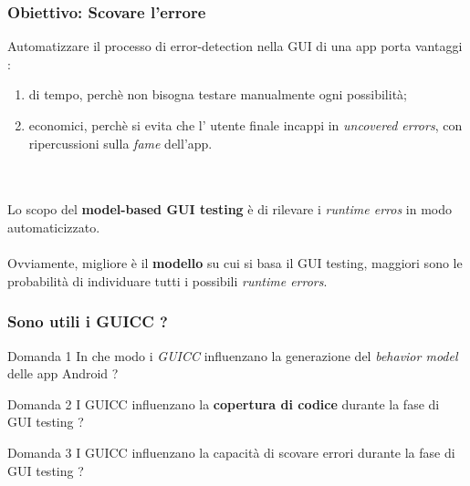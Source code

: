 \documentclass[12pt]{beamer}
\begin{document}
\begin{frame}
\frametitle{Obiettivo: Scovare l'errore}
 
    Automatizzare il processo di error-detection nella GUI di una app porta vantaggi :
    \begin{enumerate}
        \item di tempo, perch\`e non bisogna testare manualmente ogni possibilit\`a;
        \item economici, perch\`e si evita che l' utente finale incappi in \textit{uncovered errors}, con ripercussioni sulla \textit{fame} dell'app.
    \end{enumerate}
    \\~\\
    Lo scopo del \textbf{model-based GUI testing} \`e di rilevare i \textit{runtime erros} in modo automaticizzato.
    \\~\\
    Ovviamente, migliore \`e il \textbf{modello} su cui si basa il GUI testing, maggiori sono le probabilit\`a di individuare tutti i possibili \textit{runtime errors}. 




\end{frame}


\begin{frame}
\frametitle{Sono utili i GUICC ?}

\begin{block}{Domanda 1}
In che modo i \emph{GUICC} influenzano la generazione del \textit{behavior model} delle app Android ?
\end{block}

\begin{block}{Domanda 2}
    I GUICC influenzano la \textbf{copertura di codice} durante la fase di GUI testing  ? 
\end{block}

\begin{block}{Domanda 3}
I GUICC influenzano la capacit\`a di scovare errori durante la fase di GUI testing ?
\end{block}


\end{frame}

\end{document}
